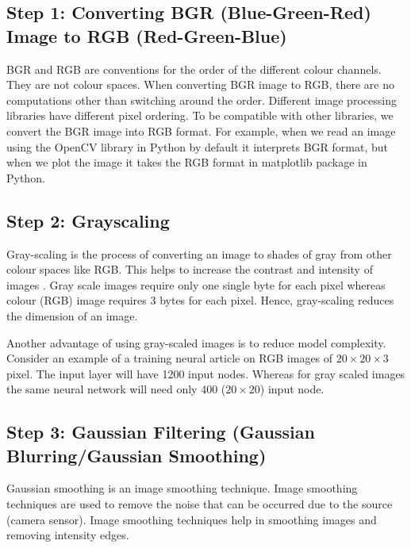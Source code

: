 \documentclass{article}
\begin{document}
\hypertarget{step-1-converting-bgr-blue-green-red-image-to-rgb-red-green-blue}{%
\subsection{Step 1: Converting BGR (Blue-Green-Red) Image to RGB
(Red-Green-Blue)}\label{step-1-converting-bgr-blue-green-red-image-to-rgb-red-green-blue}}

BGR and RGB are conventions for the order of the different colour
channels. They are not colour spaces. When converting BGR image to RGB,
there are no computations other than switching around the order. Different
image processing libraries have different pixel ordering. To
be compatible with other libraries, we convert the BGR image into RGB
format. For example, when we read an image using the OpenCV library in
Python by default it interprets BGR format, but when we plot the image
it takes the RGB format in matplotlib package in Python.

\hypertarget{step-2-grayscaling}{%
\subsection{Step 2: Grayscaling}\label{step-2-grayscaling}}

Gray-scaling is the process of converting an image to shades of
gray from other colour spaces like RGB. This helps to increase the
contrast and intensity of images \citep{8675114}. Gray
scale images require only one single byte for each pixel whereas colour
(RGB) image requires 3 bytes for each pixel. Hence, gray-scaling reduces
the dimension of an image.

Another advantage of using
gray-scaled images is to reduce model complexity. Consider an example of
a training neural article on RGB images of \(20 \times 20 \times 3\)
pixel. The input layer will have 1200 input nodes. Whereas for gray
scaled images the same neural network will need only 400
(\(20 \times 20\)) input node.

\hypertarget{step-3-gaussian-filtering-gaussian-blurringgaussian-smoothing}{%
\subsection{Step 3: Gaussian Filtering (Gaussian Blurring/Gaussian
Smoothing)}\label{step-3-gaussian-filtering-gaussian-blurringgaussian-smoothing}}

Gaussian smoothing is an image smoothing technique. Image
smoothing techniques are used to remove the noise that can be occurred
due to the source (camera sensor). Image smoothing techniques help
in smoothing images and removing intensity edges.
\end{document}

